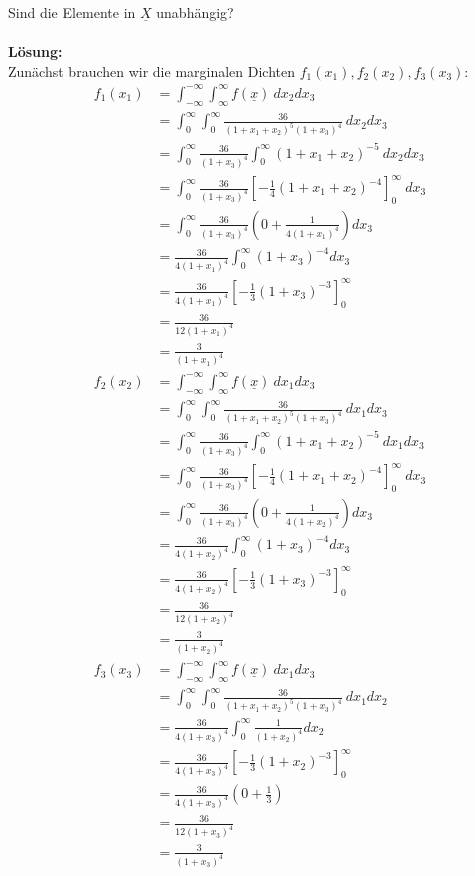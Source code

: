 \documentclass{article}
\begin{document}
Sind die Elemente in $\underline{X}$ unabhängig?\\ \\
\textbf{Lösung:}\\

Zunächst brauchen wir die marginalen Dichten $f_1(x_1), f_2(x_2), f_3(x_3)$: 
\begin{align*}
    f_1(x_1) &= \int_{-\infty}^{-\infty}\int_{\infty}^{\infty} f(\underline{x}) ~dx_2 dx_3\\
    &= \int_{0}^{\infty}\int_{0}^{\infty}\frac{36}{(1+x_1+x_2)^5(1+x_3)^4} ~dx_2 dx_3\\
    &= \int_{0}^{\infty}\frac{36}{(1+x_3)^4}\int_{0}^{\infty}(1+x_1+x_2)^{-5} ~dx_2 dx_3 \\
    &= \int_{0}^{\infty}\frac{36}{(1+x_3)^4} \left[-\frac{1}{4} (1+ x_1 + x_2)^{-4}\right]_0^{\infty} ~dx_3\\
    &= \int_{0}^{\infty}\frac{36}{(1+x_3)^4} (0 + \frac{1}{4(1+x_1)^4}) dx_3\\
    &= \frac{36}{4(1 + x_1)^4} \int_{0}^{\infty}(1+x_3)^{-4} dx_3 \\
    &= \frac{36}{4(1 + x_1)^4} \left[-\frac{1}{3}(1+x_3)^{-3}\right]_0^{\infty} \\
    &= \frac{36}{12(1+ x_1)^4} \\
    &= \frac{3}{(1+ x_1)^4}\\
    f_2(x_2) &= \int_{-\infty}^{-\infty}\int_{\infty}^{\infty} f(\underline{x}) ~dx_1 dx_3\\
    &= \int_{0}^{\infty}\int_{0}^{\infty}\frac{36}{(1+x_1+x_2)^5(1+x_3)^4} ~dx_1 dx_3\\
    &= \int_{0}^{\infty}\frac{36}{(1+x_3)^4}\int_{0}^{\infty}(1+x_1+x_2)^{-5} ~dx_1 dx_3 \\
    &= \int_{0}^{\infty}\frac{36}{(1+x_3)^4} \left[-\frac{1}{4} (1+ x_1 + x_2)^{-4}\right]_0^{\infty} ~dx_3\\
    &= \int_{0}^{\infty}\frac{36}{(1+x_3)^4} (0 + \frac{1}{4(1+x_2)^4}) dx_3\\
    &= \frac{36}{4(1 + x_2)^4} \int_{0}^{\infty}(1+x_3)^{-4} dx_3 \\
    &= \frac{36}{4(1 + x_2)^4} \left[-\frac{1}{3}(1+x_3)^{-3}\right]_0^{\infty} \\
    &= \frac{36}{12(1+ x_2)^4} \\
    &= \frac{3}{(1+ x_2)^4}\\
    f_3(x_3) &= \int_{-\infty}^{-\infty}\int_{\infty}^{\infty} f(\underline{x}) ~dx_1 dx_3\\
    &= \int_{0}^{\infty}\int_{0}^{\infty}\frac{36}{(1+x_1+x_2)^5(1+x_3)^4} ~dx_1 dx_2\\
    &= \frac{36}{4(1+x_3)^4}\int_{0}^{\infty} \frac{1}{(1+x_2)^4} dx_2 \\
    &= \frac{36}{4(1+x_3)^4}\left[-\frac{1}{3}(1 + x_2)^{-3}\right]_0^{\infty} \\
    &= \frac{36}{4(1+x_3)^4} (0 + \frac{1}{3}) \\
    &= \frac{36}{12(1+x_3)^4} \\
    &= \frac{3}{(1+x_3)^4}
\end{align*}
\end{document}
